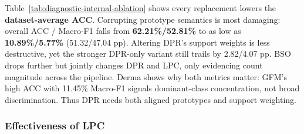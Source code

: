 \documentclass[journal,twoside,web]{ieeecolor}
\begin{document}
\begin{table}[!t]
\centering
\caption{\textbf{Internal ablation of LPC.} ACC / Macro-F1 (\%) over five datasets. LAMP-Merge attains the highest average ACC, while UPP exposes an ACC--Macro-F1 trade-off when the observed prior is removed.}
\label{tab:prevalence-internal-ablation}
\scriptsize
\renewcommand{\arraystretch}{1.1}
\setlength{\tabcolsep}{2.4pt}
\end{table}


Table~\ref{tab:diagnostic-internal-ablation} shows every replacement lowers the \textbf{dataset-average ACC}. Corrupting prototype semantics is most damaging: overall ACC / Macro-F1 falls from \textbf{62.21\%/52.81\%} to as low as \textbf{10.89\%/5.77\%} (\textcolor{DropRed}{51.32/47.04 pp}). Altering DPR's support weights is less destructive, yet the stronger DPR-only variant still trails by \textcolor{DropRed}{2.82/4.07 pp}. BSO drops further but jointly changes DPR and LPC, only evidencing count magnitude across the pipeline. Derma shows why both metrics matter: GFM's high ACC with 11.45\% Macro-F1 signals dominant-class concentration, not broad discrimination. Thus DPR needs both aligned prototypes and support weighting.


\subsubsection{Effectiveness of LPC}
\end{document}
